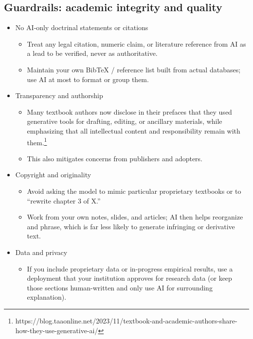 \documentclass[
  11pt,
]{article}
\providecommand{\tightlist}{%
  \setlength{\itemsep}{0pt}\setlength{\parskip}{0pt}}
\begin{document}
\subsection{Guardrails: academic integrity and quality}\label{guardrails-academic-integrity-and-quality}

\begin{itemize}
\tightlist
\item
  No AI‑only doctrinal statements or citations

  \begin{itemize}
  \tightlist
  \item
    Treat any legal citation, numeric claim, or literature reference from AI as a lead to be verified, never as authoritative.
  \item
    Maintain your own BibTeX / reference list built from actual databases; use AI at most to format or group them.
  \end{itemize}
\item
  Transparency and authorship

  \begin{itemize}
  \tightlist
  \item
    Many textbook authors now disclose in their prefaces that they used generative tools for drafting, editing, or ancillary materials, while emphasizing that all intellectual content and responsibility remain with them.\footnote{https://blog.taaonline.net/2023/11/textbook-and-academic-authors-share-how-they-use-generative-ai/}
  \item
    This also mitigates concerns from publishers and adopters.
  \end{itemize}
\item
  Copyright and originality

  \begin{itemize}
  \tightlist
  \item
    Avoid asking the model to mimic particular proprietary textbooks or to ``rewrite chapter 3 of X.''
  \item
    Work from your own notes, slides, and articles; AI then helps reorganize and phrase, which is far less likely to generate infringing or derivative text.
  \end{itemize}
\item
  Data and privacy

  \begin{itemize}
  \tightlist
  \item
    If you include proprietary data or in-progress empirical results, use a deployment that your institution approves for research data (or keep those sections human-written and only use AI for surrounding explanation).
  \end{itemize}
\end{itemize}
\end{document}
